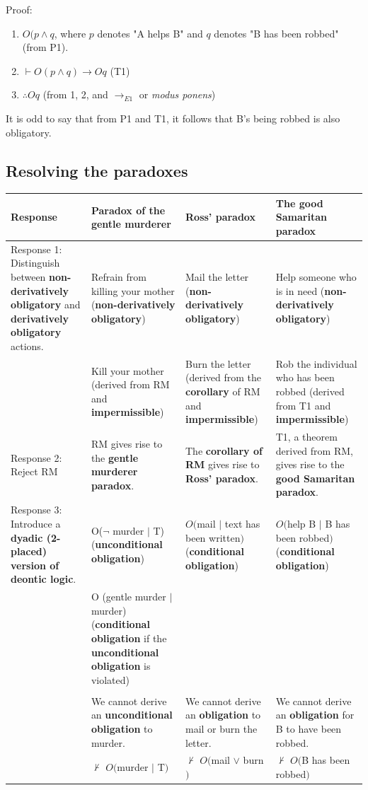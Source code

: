 \documentclass[11pt]{article}
\begin{document}
Proof:
\begin{enumerate}
\item \(O(p \wedge q\), where \(p\) denotes "A helps B" and \(q\) denotes "B has been robbed" (from P1).
\item \(\vdash O(p \wedge q) \rightarrow Oq\) (T1)
\item \(\therefore Oq\) (from 1, 2, and \(\rightarrow_{E1}\) or \emph{modus ponens})
\end{enumerate}

It is odd to say that from P1 and T1, it follows that B's being robbed is also obligatory.
\subsection{Resolving the paradoxes}
\label{sec:orgb576a52}
\begin{center}
\begin{tabularx}{1.2\textwidth}{|X|X|X|X|}
\hline
Response & Paradox of the gentle murderer & Ross' paradox & The good Samaritan paradox\\
\hline
Response 1: Distinguish between \textbf{non-derivatively obligatory} and \textbf{derivatively obligatory} actions. & Refrain from killing your mother (\textbf{non-derivatively obligatory}) & Mail the letter (\textbf{non-derivatively obligatory}) & Help someone who is in need (\textbf{non-derivatively obligatory})\\
 & Kill your mother (derived from RM and \textbf{impermissible}) & Burn the letter (derived from the \textbf{corollary} of RM and \textbf{impermissible}) & Rob the individual who has been robbed (derived from T1 and \textbf{impermissible})\\
\hline
Response 2: Reject RM & RM gives rise to the \textbf{gentle murderer paradox}. & The \textbf{corollary of RM} gives rise to \textbf{Ross' paradox}. & T1, a theorem derived from RM, gives rise to the \textbf{good Samaritan paradox}.\\
\hline
Response 3: Introduce a \textbf{dyadic (2-placed) version of deontic logic}. & O(\(\neg\) murder \(\vert\) T) (\textbf{unconditional obligation}) & \(O(\)mail \(\vert\) text has been written\()\) (\textbf{conditional obligation}) & \(O(\)help B \(\vert\) B has been robbed\()\) (\textbf{conditional obligation})\\
 & O (gentle murder \(\vert\) murder) (\textbf{conditional obligation} if the \textbf{unconditional obligation} is violated) &  & \\
 &  &  & \\
 & We cannot derive an \textbf{unconditional obligation} to murder. & We cannot derive an \textbf{obligation} to mail or burn the letter. & We cannot derive an \textbf{obligation} for B to have been robbed.\\
 & \(\nvdash\) \(O(\)murder \(\vert\) T\()\) & \(\nvdash\) \(O(\)mail \(\vee\) burn\()\) & \(\nvdash\) \(O(\)B has been robbed\()\)\\
\hline
\end{tabularx}
\end{center}
\end{document}
